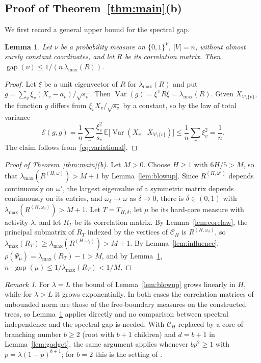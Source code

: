 \documentclass{amsart}
\numberwithin{equation}{section}
\numberwithin{table}{section}
\newtheorem{lemma}[theorem]{Lemma}
\theoremstyle{definition}
\theoremstyle{remark}
\newtheorem{remark}[theorem]{Remark}
\newcommand{\E}{\mathbb{E}}
\newcommand{\Var}{\operatorname{Var}}
\newcommand{\gap}{\operatorname{gap}}
\newcommand{\lmax}{\lambda_{\max}}
\begin{document}
\subsection{Proof of Theorem~\ref{thm:main}(b)}
We first record a general upper bound for the spectral gap.

\begin{lemma}\label{lem:gapupper}
Let $\nu$ be a probability measure on $\{0,1\}^V$, $|V|=n$, without almost surely constant coordinates, and let $R$ be its correlation matrix. Then $\gap(\nu)\le1/(n\,\lmax(R))$.
\end{lemma}

\begin{proof}
Let $\xi$ be a unit eigenvector of $R$ for $\lmax(R)$ and put $g=\sum_v\xi_v(X_v-a_v)/\sqrt{s_v}$. Then $\Var(g)=\xi^{\mathsf T}R\xi=\lmax(R)$. Given $X_{V\setminus\{v\}}$, the function $g$ differs from $\xi_vX_v/\sqrt{s_v}$ by a constant, so by the law of total variance
\[
\mathcal E(g,g)=\frac1n\sum_v\frac{\xi_v^2}{s_v}\,\E\bigl[\Var(X_v\mid X_{V\setminus\{v\}})\bigr]\le\frac1n\sum_v\xi_v^2=\frac1n .
\]
The claim follows from~\eqref{eq:variational}.
\end{proof}

\begin{proof}[Proof of Theorem~\ref{thm:main}(b)]
Let $M>0$. Choose $H\ge1$ with $6H/5>M$, so that $\lmax(R^{(H,\omega)})>M+1$ by Lemma~\ref{lem:blowup}. Since $R^{(H,\omega')}$ depends continuously on $\omega'$, the largest eigenvalue of a symmetric matrix depends continuously on its entries, and $\omega_\delta\to\omega$ as $\delta\to0$, there is $\delta\in(0,1)$ with $\lmax(R^{(H,\omega_\delta)})>M+1$. Let $T=T_{H,\delta}$, let $\mu$ be its hard-core measure with activity $\lambda$, and let $R_T$ be its correlation matrix. By Lemma~\ref{lem:corelaw}, the principal submatrix of $R_T$ indexed by the vertices of $\mathcal C_H$ is $R^{(H,\omega_\delta)}$, so $\lmax(R_T)\ge\lmax(R^{(H,\omega_\delta)})>M+1$. By Lemma~\ref{lem:influence}, $\rho(\Psi_\mu)=\lmax(R_T)-1>M$, and by Lemma~\ref{lem:gapupper}, $n\cdot\gap(\mu)\le1/\lmax(R_T)<1/M$.
\end{proof}

\begin{remark}\label{rem:upper}
For $\lambda=L$ the bound of Lemma~\ref{lem:blowup} grows linearly in $H$, while for $\lambda>L$ it grows exponentially. In both cases the correlation matrices of unbounded norm are those of the free-boundary measures on the constructed trees, so Lemma~\ref{lem:gapupper} applies directly and no comparison between spectral independence and the spectral gap is needed. With $\mathcal C_H$ replaced by a core of branching number $b\ge2$ (root with $b+1$ children) and $d=b+1$ in Lemma~\ref{lem:gadget}, the same argument applies whenever $bp^2\ge1$ with $p=\lambda(1-p)^{b+1}$; for $b=2$ this is the setting of \cite[Section~5.2]{CYYZ}.
\end{remark}
\end{document}
